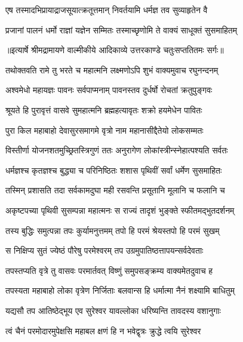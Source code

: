 \twolineshloka
{एष तस्मादभिप्रायाद्राजसूयात्क्रतूत्तमान्}
{निवर्तयामि धर्मज्ञ तव सुव्याहृतेन वै} %

\twolineshloka
{प्रजानां पालनं धर्मो राज्ञां यज्ञेन सम्मितः}
{तस्माच्छृणोमि ते वाक्यं साधूक्तं सुसमाहितम्} %


{॥इत्यार्षे श्रीमद्रामायणे वाल्मीकीये आदिकाव्ये उत्तरकाण्डे चतुःसप्ततितमः सर्गः॥}


\twolineshloka
{तथोक्तवति रामे तु भरते च महात्मनि}
{लक्ष्मणोऽपि शुभं वाक्यमुवाच रघुनन्दनम्} %

\twolineshloka
{अश्वमेधो महायज्ञः पावनः सर्वपाप्मनाम्}
{पावनस्तव दुर्धर्षो रोचतां क्रतुपुङ्गवः} %

\twolineshloka
{श्रूयते हि पुरावृत्तं वासवे सुमहात्मनि}
{ब्रह्महत्यावृतः शक्रो हयमेधेन पावितः} %

\twolineshloka
{पुरा किल महाबाहो देवासुरसमागमे}
{वृत्रो नाम महानासीद्दैतेयो लोकसम्मतः} %

\twolineshloka
{विस्तीर्णा योजनशतमुच्छ्रितस्त्रिगुणं ततः}
{अनुरागेण लोकांस्त्रीन्स्नेहात्पश्यति सर्वतः} %

\twolineshloka
{धर्मज्ञश्च कृतज्ञश्च बुद्ध्या च परिनिष्ठितः}
{शशास पृथिवीं सर्वां धर्मेण सुसमाहितः} %

\twolineshloka
{तस्मिन् प्रशासति तदा सर्वकामदुघा मही}
{रसवन्ति प्रसूतानि मूलानि च फलानि च} %

\twolineshloka
{अकृष्टपच्या पृथिवी सुसम्पन्ना महात्मनः}
{स राज्यं तादृशं भुङ्क्ते स्फीतमद्भुतदर्शनम्} %

\twolineshloka
{तस्य बुद्धिः समुत्पन्ना तपः कुर्यामनुत्तमम्}
{तपो हि परमं श्रेयस्तपो हि परमं सुखम्} %

\twolineshloka
{स निक्षिप्य सुतं ज्येष्ठं पौरेषु परमेश्वरम्}
{तप उग्रमुपातिष्ठत्तापयन्सर्वदेवताः} %

\twolineshloka
{तपस्तप्यति वृत्रे तु वासवः परमार्तवत्}
{विष्णुं समुपसङ्क्रम्य वाक्यमेतदुवाच ह} %

\twolineshloka
{तपस्यता महाबाहो लोका वृत्रेण निर्जिताः}
{बलवान्स हि धर्मात्मा नैनं शक्ष्यामि बाधितुम्} %

\twolineshloka
{यद्यसौ तप आतिष्ठेद्भूय एव सुरेश्वर}
{यावल्लोका धरिष्यन्ति तावदस्य वशानुगाः} %

\twolineshloka
{त्वं चैनं परमोदारमुपेक्षसि महाबल}
{क्षणं हि न भवेद्वृत्रः क्रुद्धे त्वयि सुरेश्वर} %

